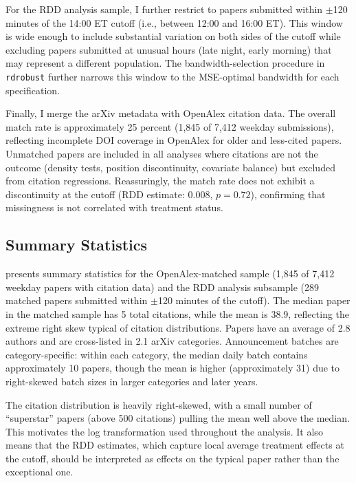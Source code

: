 \documentclass[12pt]{article}
\begin{document}
For the RDD analysis sample, I further restrict to papers submitted within $\pm$120 minutes of the 14:00 ET cutoff (i.e., between 12:00 and 16:00 ET). This window is wide enough to include substantial variation on both sides of the cutoff while excluding papers submitted at unusual hours (late night, early morning) that may represent a different population. The bandwidth-selection procedure in \texttt{rdrobust} further narrows this window to the MSE-optimal bandwidth for each specification.

Finally, I merge the arXiv metadata with OpenAlex citation data. The overall match rate is approximately 25 percent (1,845 of 7,412 weekday submissions), reflecting incomplete DOI coverage in OpenAlex for older and less-cited papers. Unmatched papers are included in all analyses where citations are not the outcome (density tests, position discontinuity, covariate balance) but excluded from citation regressions. Reassuringly, the match rate does not exhibit a discontinuity at the cutoff (RDD estimate: 0.008, $p = 0.72$), confirming that missingness is not correlated with treatment status.

\subsection{Summary Statistics}

 presents summary statistics for the OpenAlex-matched sample (1,845 of 7,412 weekday papers with citation data) and the RDD analysis subsample (289 matched papers submitted within $\pm$120 minutes of the cutoff). The median paper in the matched sample has 5 total citations, while the mean is 38.9, reflecting the extreme right skew typical of citation distributions. Papers have an average of 2.8 authors and are cross-listed in 2.1 arXiv categories. Announcement batches are category-specific: within each category, the median daily batch contains approximately 10 papers, though the mean is higher (approximately 31) due to right-skewed batch sizes in larger categories and later years.

The citation distribution is heavily right-skewed, with a small number of ``superstar'' papers (above 500 citations) pulling the mean well above the median. This motivates the log transformation used throughout the analysis. It also means that the RDD estimates, which capture local average treatment effects at the cutoff, should be interpreted as effects on the typical paper rather than the exceptional one.
\end{document}
